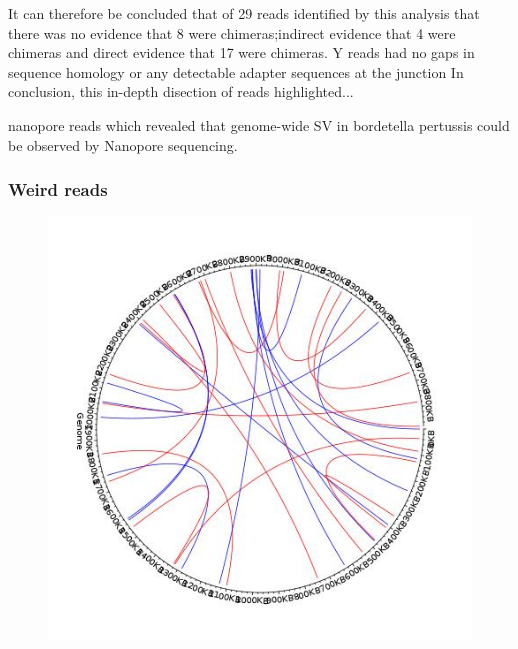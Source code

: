 It can therefore be concluded that of 29 reads identified by this analysis that there was no evidence that 8 were chimeras;indirect evidence that 4 were chimeras and direct evidence that 17 were chimeras.
Y reads had no gaps in sequence homology or any detectable adapter sequences at the junction
In conclusion, this in-depth disection of reads highlighted...


nanopore reads which revealed that genome-wide SV in bordetella pertussis could be observed by Nanopore sequencing. 



\subsubsection{Weird reads}

\begin{figure}[h!]
\centering
\includegraphics[width=\textwidth{}]{Chapter_2/UK54_new_basketball.jpeg}
\caption{  }
\label{fig:UK54_new_basket}
\end{figure}
 
